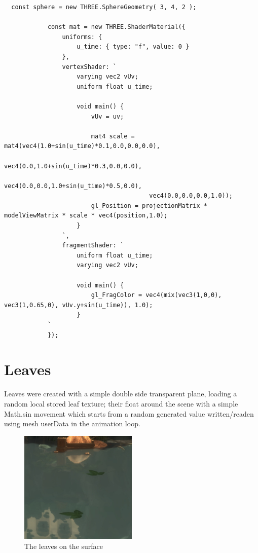 \documentclass[10pt,a4paper]{article}
\begin{document}
\begin{verbatim}
  const sphere = new THREE.SphereGeometry( 3, 4, 2 );

            const mat = new THREE.ShaderMaterial({
                uniforms: {
                    u_time: { type: "f", value: 0 }
                },
                vertexShader: `
                    varying vec2 vUv;
                    uniform float u_time;

                    void main() {
                        vUv = uv;

                        mat4 scale = mat4(vec4(1.0+sin(u_time)*0.1,0.0,0.0,0.0),
                                        vec4(0.0,1.0+sin(u_time)*0.3,0.0,0.0),
                                        vec4(0.0,0.0,1.0+sin(u_time)*0.5,0.0),
                                        vec4(0.0,0.0,0.0,1.0));
                        gl_Position = projectionMatrix * modelViewMatrix * scale * vec4(position,1.0);
                    }
                `,
                fragmentShader: `
                    uniform float u_time;
                    varying vec2 vUv;
                    
                    void main() {
                        gl_FragColor = vec4(mix(vec3(1,0,0), vec3(1,0.65,0), vUv.y+sin(u_time)), 1.0);
                    }
            `
            });
\end{verbatim}

\section{Leaves}

Leaves were created with a simple double side transparent plane, loading a random local stored leaf texture; their float around the scene with a simple Math.sin movement which starts from a random generated value written/readen using mesh userData in the animation loop.

\begin{center}
\begin{figure}[H]
  \includegraphics[width=0.5\textwidth]{leaves}
     \caption{The leaves on the surface}
\end{figure}
\end{center}
\end{document}
